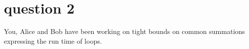 \section{question 2}
You, Alice and Bob have been working on tight bounds on common summations expressing the run time of loops. 
